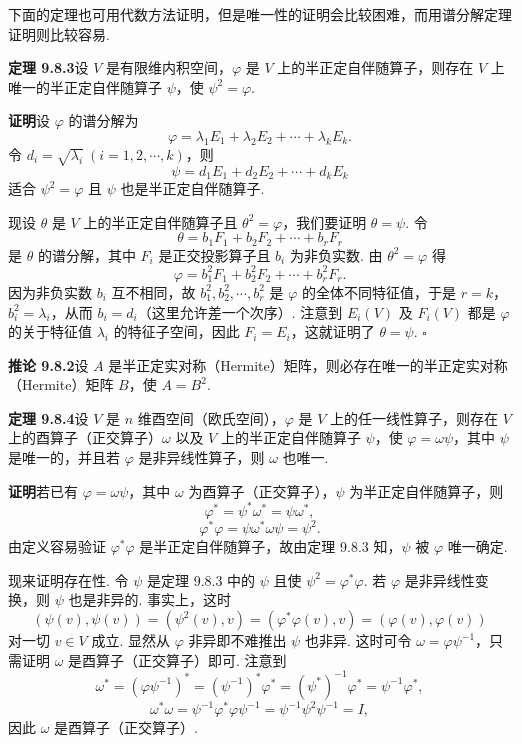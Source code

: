 \documentclass[UTF8, 12pt, fontset=fandol, oneside]{ctexart}
\begin{document}
下面的定理也可用代数方法证明，但是唯一性的证明会比较困难，而用谱分解定理证明则比较容易.

\noindent\textbf{定理 9.8.3}\quad 设 $V$ 是有限维内积空间，$\varphi$ 是 $V$ 上的半正定自伴随算子，则存在 $V$ 上唯一的半正定自伴随算子 $\psi$，使 $\psi^2=\varphi$.

\noindent\textbf{证明}\quad 设 $\varphi$ 的谱分解为
\[
  \varphi=\lambda_1E_1+\lambda_2E_2+\cdots+\lambda_kE_k.
\]
令 $d_i=\sqrt{\lambda_i}\ (i=1,2,\cdots,k)$，则
\[
  \psi=d_1E_1+d_2E_2+\cdots+d_kE_k
\]
适合 $\psi^2=\varphi$ 且 $\psi$ 也是半正定自伴随算子.

现设 $\theta$ 是 $V$ 上的半正定自伴随算子且 $\theta^2=\varphi$，我们要证明 $\theta=\psi$. 令
\[
  \theta=b_1F_1+b_2F_2+\cdots+b_rF_r
\]
是 $\theta$ 的谱分解，其中 $F_i$ 是正交投影算子且 $b_i$ 为非负实数. 由 $\theta^2=\varphi$ 得
\[
  \varphi=b_1^2F_1+b_2^2F_2+\cdots+b_r^2F_r.
\]
因为非负实数 $b_i$ 互不相同，故 $b_1^2,b_2^2,\cdots,b_r^2$ 是 $\varphi$ 的全体不同特征值，于是 $r=k$，$b_i^2=\lambda_i$，从而 $b_i=d_i$（这里允许差一个次序）. 注意到 $E_i(V)$ 及 $F_i(V)$ 都是 $\varphi$ 的关于特征值 $\lambda_i$ 的特征子空间，因此 $F_i=E_i$，这就证明了 $\theta=\psi$. $\square$

\noindent\textbf{推论 9.8.2}\quad 设 $A$ 是半正定实对称（Hermite）矩阵，则必存在唯一的半正定实对称（Hermite）矩阵 $B$，使 $A=B^2$.

\noindent\textbf{定理 9.8.4}\quad 设 $V$ 是 $n$ 维酉空间（欧氏空间），$\varphi$ 是 $V$ 上的任一线性算子，则存在 $V$ 上的酉算子（正交算子）$\omega$ 以及 $V$ 上的半正定自伴随算子 $\psi$，使 $\varphi=\omega\psi$，其中 $\psi$ 是唯一的，并且若 $\varphi$ 是非异线性算子，则 $\omega$ 也唯一.

\noindent\textbf{证明}\quad 若已有 $\varphi=\omega\psi$，其中 $\omega$ 为酉算子（正交算子），$\psi$ 为半正定自伴随算子，则
\[
  \varphi^*=\psi^*\omega^*=\psi\omega^*,
\]
\[
  \varphi^*\varphi=\psi\omega^*\omega\psi=\psi^2.
\]
由定义容易验证 $\varphi^*\varphi$ 是半正定自伴随算子，故由定理 9.8.3 知，$\psi$ 被 $\varphi$ 唯一确定.

现来证明存在性. 令 $\psi$ 是定理 9.8.3 中的 $\psi$ 且使 $\psi^2=\varphi^*\varphi$. 若 $\varphi$ 是非异线性变换，则 $\psi$ 也是非异的. 事实上，这时
\begin{equation}
  (\psi(v),\psi(v))=(\psi^2(v),v)=(\varphi^*\varphi(v),v)=(\varphi(v),\varphi(v))
  \tag{9.8.2}
\end{equation}
对一切 $v\in V$ 成立. 显然从 $\varphi$ 非异即不难推出 $\psi$ 也非异. 这时可令 $\omega=\varphi\psi^{-1}$，只需证明 $\omega$ 是酉算子（正交算子）即可. 注意到
\[
  \omega^*=(\varphi\psi^{-1})^*=(\psi^{-1})^*\varphi^*=(\psi^*)^{-1}\varphi^*=\psi^{-1}\varphi^*,
\]
\[
  \omega^*\omega=\psi^{-1}\varphi^*\varphi\psi^{-1}=\psi^{-1}\psi^2\psi^{-1}=I,
\]
因此 $\omega$ 是酉算子（正交算子）.
\end{document}
